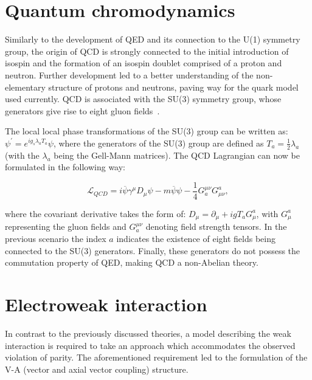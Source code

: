 \section{Quantum chromodynamics}
\hspace{10pt} Similarly to the development of QED and its connection to the U(1) symmetry group, the origin of QCD is strongly connected to the initial introduction of isospin and the formation of an isospin doublet comprised of a proton and neutron. Further development led to a better understanding of the non-elementary structure of protons and neutrons, paving way for the quark model used currently. QCD is associated with the SU(3) symmetry group, whose generators give rise to eight gluon fields~\cite{thomson_2013,book:schwartz, gell_mann}. %

\hspace{10pt} The local local phase transformations of the SU(3) group can be written as: $\psi^{'} = e^{ig_{s}\lambda_a T_a}\psi$, where the generators of the SU(3) group are defined as $T_a = \frac{1}{2}\lambda_a$ (with the $\lambda_a$ being the Gell-Mann matrices). The QCD Lagrangian can now be formulated in the following way:

\begin{equation}
    \mathcal{L}_{QCD} = i\overline{\psi}\gamma^{\mu}D_{\mu}\psi - m\overline{\psi}\psi - \frac{1}{4}G_{a}^{\mu\nu}G^{a}_{\mu\nu},
\end{equation}

where the covariant derivative takes the form of: $D_{\mu} = \partial_{\mu} + igT_aG^{a}_{\mu}$, with $G_{\mu}^a$ representing the gluon fields and  $G_a^{\mu\nu}$ denoting field strength tensors. In the previous scenario the index $a$ indicates the existence of eight fields being connected to the SU(3) generators. Finally, these generators do not possess the commutation property of QED, making QCD a non-Abelian theory.
\section{Electroweak interaction}
\label{sec:ew_unification}
\hspace{10pt} In contrast to the previously discussed theories, a model describing the weak interaction is required to take an approach which accommodates the observed violation of parity. The aforementioned requirement led to the formulation of the V-A (vector and axial vector coupling) structure. 

